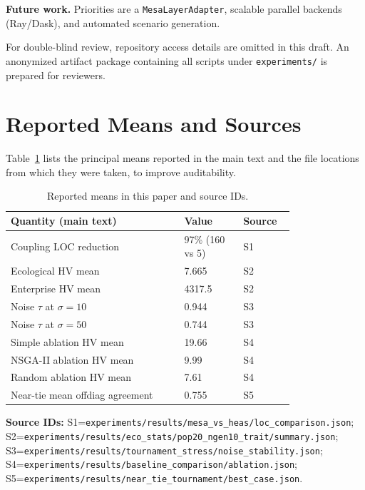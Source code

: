 \documentclass{wscpaperproc}
\begin{document}
\textbf{Future work.} Priorities are a \texttt{MesaLayerAdapter}, scalable
parallel backends (Ray/Dask), and automated scenario generation.

For double-blind review, repository access details are omitted in this draft.
An anonymized artifact package containing all scripts under
\texttt{experiments/} is prepared for reviewers.

\appendix
\section{Reported Means and Sources}

Table~\ref{tab:appendix-results} lists the principal means reported in the main
text and the file locations from which they were taken, to improve auditability.

\begin{table}[t]
\caption{Reported means in this paper and source IDs.}
\label{tab:appendix-results}
\centering\small
\begin{tabular}{p{0.50\linewidth}p{0.17\linewidth}p{0.12\linewidth}}
\toprule
Quantity (main text) & Value & Source \\
\midrule
Coupling LOC reduction & 97\% (160 vs 5) & S1 \\
Ecological HV mean & 7.665 & S2 \\
Enterprise HV mean & 4317.5 & S2 \\
Noise $\tau$ at $\sigma=10$ & 0.944 & S3 \\
Noise $\tau$ at $\sigma=50$ & 0.744 & S3 \\
Simple ablation HV mean & 19.66 & S4 \\
NSGA-II ablation HV mean & 9.99 & S4 \\
Random ablation HV mean & 7.61 & S4 \\
Near-tie mean offdiag agreement & 0.755 & S5 \\
\bottomrule
\end{tabular}
\end{table}

\noindent\textbf{Source IDs:}
S1=\texttt{experiments/results/mesa\_vs\_heas/loc\_comparison.json};
S2=\texttt{experiments/results/eco\_stats/pop20\_ngen10\_trait/summary.json};
S3=\texttt{experiments/results/tournament\_stress/noise\_stability.json};
S4=\texttt{experiments/results/baseline\_comparison/ablation.json};
S5=\texttt{experiments/results/near\_tie\_tournament/best\_case.json}.

\begingroup
\small


\endgroup
\end{document}
